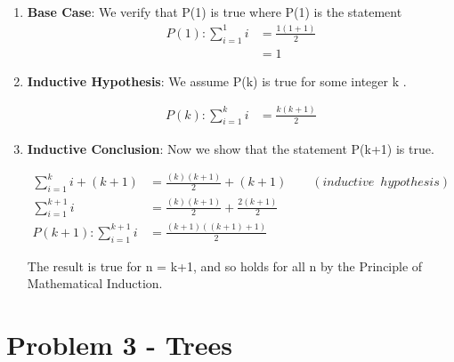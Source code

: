 \documentclass[12pt]{article}
\begin{document}
\begin{enumerate}[1)]
\item{{\bf Base Case}: We verify that P(1) is true where P(1) is the statement
\begin{align*}
P(1): \sum_{i = 1}^{1} i &= \frac{1(1+1)}{2} \\
 &= 1
\end{align*}
}

\item{{\bf Inductive Hypothesis}: We assume P(k) is true for some integer k .

\begin{align*}
P(k): \sum_{i = 1}^{k} i &= \frac{k(k+1)}{2} 
\end{align*}
}

\item{{\bf Inductive Conclusion}: Now we show that the statement P(k+1) is true.

\begin{align*}
    \sum_{i = 1}^{k} i + (k+1) &= \frac{(k)(k+1)}{2} + (k+1) \qquad (inductive\enspace hypothesis) \\
    \sum_{i = 1}^{k+1} i &= \frac{(k)(k+1)}{2} + \frac{2(k+1)}{2} \\
    P(k+1): \sum_{i = 1}^{k+1} i &= \frac{(k+1)((k+1)+1)}{2}
    \end{align*}
}

The result is true for n = k+1, and so holds for all n by the Principle of Mathematical
Induction.

\end{enumerate}

\section*{Problem 3 - Trees}

\begin{center}\end{center}
\end{document}
